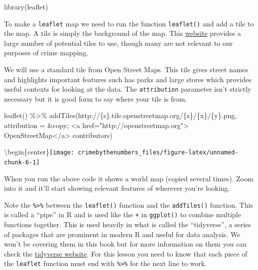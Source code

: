 \documentclass[
  12pt,
  openany]{book}
\newenvironment{Shaded}{\begin{snugshade}}{\end{snugshade}}
\newcommand{\AttributeTok}[1]{\textcolor[rgb]{0.61,0.61,0.61}{#1}}
\newcommand{\FunctionTok}[1]{\textcolor[rgb]{0,0,0}{#1}}
\newcommand{\NormalTok}[1]{#1}
\newcommand{\SpecialCharTok}[1]{\textcolor[rgb]{0,0,0}{#1}}
\newcommand{\StringTok}[1]{\textcolor[rgb]{0.5,0.5,0.5}{#1}}
\begin{document}
\begin{Shaded}
\begin{Highlighting}[]
\FunctionTok{library}\NormalTok{(leaflet)}
\end{Highlighting}
\end{Shaded}

To make a \texttt{leaflet} map we need to run the function \texttt{leaflet()} and add a tile to the map. A tile is simply the background of the map. This \href{https://leaflet-extras.github.io/leaflet-providers/preview/}{website} provides a large number of potential tiles to use, though many are not relevant to our purposes of crime mapping.

We will use a standard tile from Open Street Maps. This tile gives street names and highlights important features such has parks and large stores which provides useful contexts for looking at the data. The \texttt{attribution} parameter isn't strictly necessary but it is good form to say where your tile is from.

\begin{Shaded}
\begin{Highlighting}[]
\FunctionTok{leaflet}\NormalTok{() }\SpecialCharTok{\%\textgreater{}\%} 
  \FunctionTok{addTiles}\NormalTok{(}\StringTok{\textquotesingle{}http://\{s\}.tile.openstreetmap.org/\{z\}/\{x\}/\{y\}.png\textquotesingle{}}\NormalTok{, }
           \AttributeTok{attribution =} \StringTok{\textquotesingle{}\&copy; \textless{}a href="http://openstreetmap.org"\textgreater{}}
\StringTok{                OpenStreetMap\textless{}/a\textgreater{} contributors\textquotesingle{}}\NormalTok{)}
\end{Highlighting}
\end{Shaded}

\textbackslash begin\{center\}\texttt{[image: crimebythenumbers\_files/figure-latex/unnamed-chunk-6-1]}

When you run the above code it shows a world map (copied several times). Zoom into it and it'll start showing relevant features of wherever you're looking.

Note the \texttt{\%\textgreater{}\%} between the \texttt{leaflet()} function and the \texttt{addTiles()} function. This is called a ``pipe'' in R and is used like the \texttt{+} in \texttt{ggplot()} to combine multiple functions together. This is used heavily in what is called the ``tidyverse'', a series of packages that are prominent in modern R and useful for data analysis. We won't be covering them in this book but for more information on them you can check the \href{https://www.tidyverse.org/}{tidyverse website}. For this lesson you need to know that each piece of the \texttt{leaflet} function must end with \texttt{\%\textgreater{}\%} for the next line to work.
\end{document}
